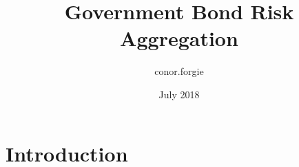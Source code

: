 \documentclass{article}
\title{Government Bond Risk Aggregation}
\author{conor.forgie }
\date{July 2018}
\begin{document}
\maketitle

\section{Introduction}
\end{document}
